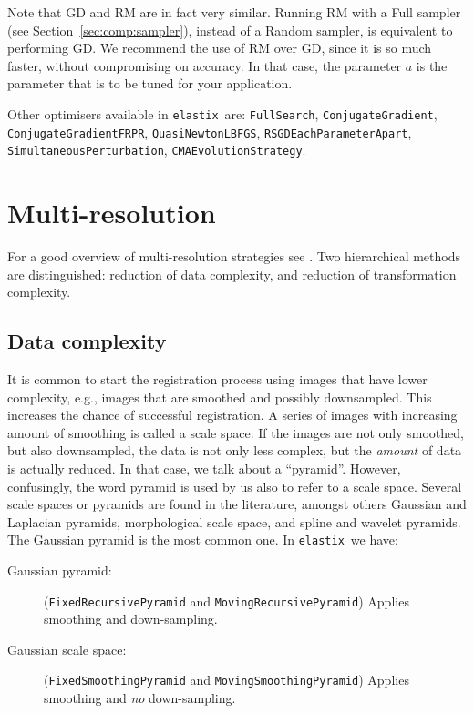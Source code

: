 \documentclass[]{report}
\newcommand{\elastix}{\texttt{elastix}}
\begin{document}
Note that GD and RM are in fact very similar. Running RM with a Full
sampler (see Section~\ref{sec:comp:sampler}), instead of a Random
sampler, is equivalent to performing GD. We recommend the use of RM
over GD, since it is so much faster, without compromising on
accuracy. In that case, the parameter $a$ is the parameter that is to
be tuned for your application.

Other optimisers available in \elastix\ are: \texttt{FullSearch},
\texttt{ConjugateGradient}, \texttt{ConjugateGradientFRPR},
\texttt{QuasiNewtonLBFGS}, \texttt{RSGDEachParameterApart},
\texttt{SimultaneousPerturbation}, \texttt{CMAEvolutionStrategy}.

\section{Multi-resolution}\label{sec:comp:multiresolution}

For a good overview of multi-resolution strategies see
\citet{LesterEA99}. Two hierarchical methods are distinguished:
reduction of data complexity, and reduction of transformation
complexity.

\subsection{Data complexity}

It is common to start the registration process using images that have
lower complexity, e.g., images that are smoothed and possibly
downsampled. This increases the chance of successful registration. A
series of images with increasing amount of smoothing is called a
scale space. If the images are not only smoothed, but also
downsampled, the data is not only less complex, but the \emph{amount}
of data is actually reduced. In that case, we talk about a
``pyramid''. However, confusingly, the word pyramid is used by us
also to refer to a scale space. Several scale spaces or pyramids are
found in the literature, amongst others Gaussian and Laplacian
pyramids, morphological scale space, and spline and wavelet pyramids.
The Gaussian pyramid is the most common one. In \elastix\ we have:
\begin{description}
\item[Gaussian pyramid:] (\texttt{FixedRecursivePyramid} and
\texttt{MovingRecursivePyramid}) Applies smoothing and down-sampling.

\item[Gaussian scale space:] (\texttt{FixedSmoothingPyramid} and
\texttt{MovingSmoothingPyramid}) Applies smoothing and \emph{no}
down-sampling.
\end{description}
\end{document}
